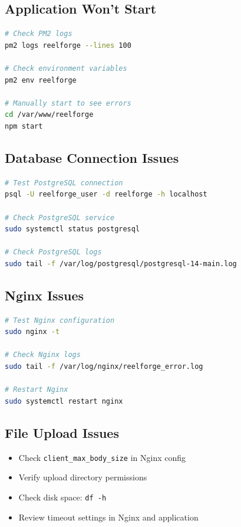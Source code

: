 \subsection{Application Won't Start}

\begin{lstlisting}[language=bash]
# Check PM2 logs
pm2 logs reelforge --lines 100

# Check environment variables
pm2 env reelforge

# Manually start to see errors
cd /var/www/reelforge
npm start
\end{lstlisting}

\subsection{Database Connection Issues}

\begin{lstlisting}[language=bash]
# Test PostgreSQL connection
psql -U reelforge_user -d reelforge -h localhost

# Check PostgreSQL service
sudo systemctl status postgresql

# Check PostgreSQL logs
sudo tail -f /var/log/postgresql/postgresql-14-main.log
\end{lstlisting}

\subsection{Nginx Issues}

\begin{lstlisting}[language=bash]
# Test Nginx configuration
sudo nginx -t

# Check Nginx logs
sudo tail -f /var/log/nginx/reelforge_error.log

# Restart Nginx
sudo systemctl restart nginx
\end{lstlisting}

\subsection{File Upload Issues}

\begin{itemize}
    \item Check \texttt{client\_max\_body\_size} in Nginx config
    \item Verify upload directory permissions
    \item Check disk space: \texttt{df -h}
    \item Review timeout settings in Nginx and application
\end{itemize}

